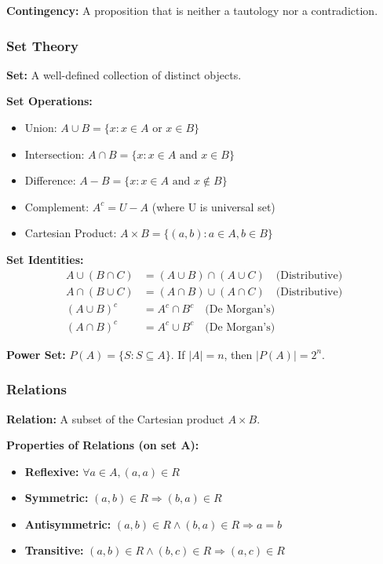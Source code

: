 \documentclass[11pt,a4paper]{article}
\begin{document}
\textbf{Contingency:} A proposition that is neither a tautology nor a contradiction.

\subsubsection{Set Theory}

\begin{defbox}
\textbf{Set:} A well-defined collection of distinct objects.
\end{defbox}

\textbf{Set Operations:}
\begin{itemize}
    \item Union: $A \cup B = \{x : x \in A \text{ or } x \in B\}$
    \item Intersection: $A \cap B = \{x : x \in A \text{ and } x \in B\}$
    \item Difference: $A - B = \{x : x \in A \text{ and } x \notin B\}$
    \item Complement: $A^c = U - A$ (where U is universal set)
    \item Cartesian Product: $A \times B = \{(a,b) : a \in A, b \in B\}$
\end{itemize}

\begin{formulabox}
\textbf{Set Identities:}
\begin{align*}
    A \cup (B \cap C) &= (A \cup B) \cap (A \cup C) \quad \text{(Distributive)} \\
    A \cap (B \cup C) &= (A \cap B) \cup (A \cap C) \quad \text{(Distributive)} \\
    (A \cup B)^c &= A^c \cap B^c \quad \text{(De Morgan's)} \\
    (A \cap B)^c &= A^c \cup B^c \quad \text{(De Morgan's)}
\end{align*}
\end{formulabox}

\textbf{Power Set:} $P(A) = \{S : S \subseteq A\}$. If $|A| = n$, then $|P(A)| = 2^n$.

\subsubsection{Relations}

\begin{defbox}
\textbf{Relation:} A subset of the Cartesian product $A \times B$.
\end{defbox}

\textbf{Properties of Relations (on set A):}
\begin{itemize}
    \item \textbf{Reflexive:} $\forall a \in A, (a,a) \in R$
    \item \textbf{Symmetric:} $(a,b) \in R \Rightarrow (b,a) \in R$
    \item \textbf{Antisymmetric:} $(a,b) \in R \wedge (b,a) \in R \Rightarrow a = b$
    \item \textbf{Transitive:} $(a,b) \in R \wedge (b,c) \in R \Rightarrow (a,c) \in R$
\end{itemize}
\end{document}
